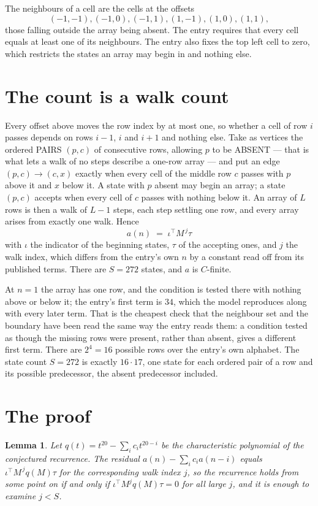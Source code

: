 \documentclass[11pt,a4paper]{article}
\theoremstyle{plain}
\newtheorem{lemma}[theorem]{Lemma}
\theoremstyle{definition}
\begin{document}
The neighbours of a cell are the cells at the offsets
\[
(-1,-1), (-1,0), (-1,1), (1,-1), (1,0), (1,1),
\]
those falling outside the array being absent. The entry requires that every cell equals at least one of its neighbours. The entry also fixes the top left cell to zero, which restricts the states an array may begin in and nothing else.

\section{The count is a walk count}

Every offset above moves the row index by at most one, so whether a cell of row $i$ passes
depends on rows $i-1$, $i$ and $i+1$ and nothing else. Take as vertices the ordered PAIRS
$(p,c)$ of consecutive rows, allowing $p$ to be ABSENT --- that is what lets a walk of no steps
describe a one-row array --- and put an edge $(p,c)\to(c,x)$ exactly when every cell of the
middle row $c$ passes with $p$ above it and $x$ below it. A state with $p$ absent may begin an
array; a state $(p,c)$ accepts when every cell of $c$ passes with nothing below it. An array of
$L$ rows is then a walk of $L-1$ steps, each step settling one row, and every array arises from
exactly one walk. Hence
\[
a(n)\;=\;\iota^{\!\top}M^{\,j}\tau
\]
with $\iota$ the indicator of the beginning states, $\tau$ of the accepting ones, and $j$ the
walk index, which differs from the entry's own $n$ by a constant read off from its published
terms. There are $S=272$ states, and $a$ is $C$-finite.

At $n=1$ the array has one row, and
the condition is tested there with nothing above or below it; the entry's first term is
$34$, which the model reproduces along with every later term. That is the cheapest check
that the neighbour set and the boundary have been read the same way the entry reads them: a
condition tested as though the missing rows were present, rather than absent, gives a different
first term. There are $2^{4}=16$ possible rows over the entry's own alphabet. The state count $S=272$ is exactly $16\cdot17$,
one state for each ordered pair of a row and its possible predecessor, the absent predecessor
included.

\section{The proof}

\begin{lemma}\label{lem:crit}
Let $q(t)=t^{20}-\sum_i c_it^{20-i}$ be the characteristic polynomial of the
conjectured recurrence. The residual $a(n)-\sum_ic_ia(n-i)$ equals
$\iota^{\!\top}M^{\,j}q(M)\tau$ for the corresponding walk index $j$, so the recurrence
holds from some point on if and only if $\iota^{\!\top}M^{j}q(M)\tau=0$ for all large $j$,
and it is enough to examine $j<S$.
\end{lemma}
\end{document}
